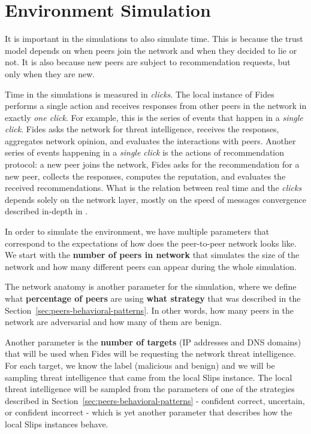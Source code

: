 \section{Environment Simulation}
\label{sec:environment-simulation}
It is important in the simulations to also simulate time. This is because the trust model depends on when peers join the network and when they decided to lie or not. It is also because new peers are subject to recommendation requests, but only when they are new.

Time in the simulations is measured in \textit{clicks}. 
The local instance of Fides performs a single action and receives responses from other peers in the network in exactly \textit{one click}. 
For example, this is the series of events that happen in a \textit{single click}. Fides asks the network for threat intelligence, receives the responses, aggregates network opinion, and evaluates the interactions with peers.
Another series of events happening in a \textit{single click} is the actions of  recommendation protocol: a new peer joins the network, Fides asks for the recommendation for  a new peer, collects the responses, computes the reputation, and evaluates the received recommendations.
What is the relation between real time and the \textit{clicks} depends solely on the network layer, mostly on the speed of messages convergence described in-depth in \cite{nl}.

In order to simulate the environment, we have multiple parameters that correspond to the expectations of how does the peer-to-peer network looks like.
We start with the \textbf{number of peers in network} that simulates the size of the network and how many different peers can appear during the whole simulation.

The network anatomy is another parameter for the simulation, where we define what \textbf{percentage of peers} are using \textbf{what strategy} that was described in the Section~\ref{sec:peers-behavioral-patterns}. 
In other words, how many peers in the network are adversarial and how many of them are benign.

Another parameter is the \textbf{number of targets} (IP addresses and DNS domains) that will be used when Fides will be requesting the network threat intelligence.
For each target, we know the label (malicious and benign) and we will be sampling threat intelligence that came from the local Slips instance. 
The local threat intelligence will be sampled from the parameters of one of the strategies described in Section~\ref{sec:peers-behavioral-patterns} - confident correct, uncertain, or confident incorrect - which is yet another parameter that describes how the local Slips instances behave.


